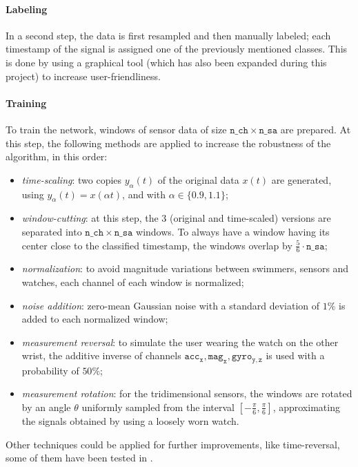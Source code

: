 \documentclass[a4paper, oneside]{discothesis}
\begin{document}
\paragraph{Labeling} In a second step, the data is first resampled and then manually labeled; each timestamp of the signal is assigned one of the previously mentioned classes. This is done by using a graphical tool (which has also been expanded during this project) to increase user-friendliness.

\paragraph{Training} To train the network, windows of sensor data of size $\mathtt{n\_ch}\times\mathtt{n\_sa}$ are prepared. At this step, the following methods are applied to increase the robustness of the algorithm, in this order:
\begin{itemize}
    \item \textit{time-scaling}: two copies $y_\alpha(t)$ of the original data $x(t)$ are generated, using $y_\alpha(t)=x(\alpha t)$, and with $\alpha \in \{0.9,1.1\}$;
    \item \textit{window-cutting}: at this step, the 3 (original and time-scaled) versions are separated into $\mathtt{n\_ch}\times\mathtt{n\_sa}$ windows. To always have a window having its center close to the classified timestamp, the windows overlap by $\frac{5}{6}\cdot \mathtt{n\_sa}$;
    \item \textit{normalization}: to avoid magnitude variations between swimmers, sensors and watches, each channel of each window is normalized;
    \item \textit{noise addition}: zero-mean Gaussian noise with a standard deviation of $1\%$ is added to each normalized window;
    \item \textit{measurement reversal}: to simulate the user wearing the watch on the other wrist, the additive inverse of channels $\mathtt{acc_x}, \mathtt{mag_x}, \mathtt{gyro_{y,z}}$ is used with a probability of $50\%$;
    \item \textit{measurement rotation}: for the tridimensional sensors, the windows are rotated by an angle $\theta$ uniformly sampled from the interval $[-\frac{\pi}{6},\frac{\pi}{6}]$, approximating the signals obtained by using a loosely worn watch.
\end{itemize}

Other techniques could be applied for further improvements, like time-reversal, some of them have been tested in \cite{WANG19}.
\end{document}
